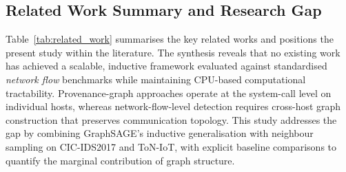 \documentclass[conference]{IEEEtran}
\begin{document}
\subsection{Related Work Summary and Research Gap}

Table~\ref{tab:related_work} summarises the key related works and positions the
present study within the literature. The synthesis reveals that no existing work
has achieved a scalable, inductive framework evaluated against standardised
\textit{network flow} benchmarks while maintaining CPU-based computational
tractability. Provenance-graph approaches \cite{xu2024,ren2023,han2020,king2003}
operate at the system-call level on individual hosts, whereas network-flow-level
detection requires cross-host graph construction that preserves communication
topology. This study addresses the gap by combining GraphSAGE's inductive
generalisation with neighbour sampling on CIC-IDS2017 and ToN-IoT, with
explicit baseline comparisons to quantify the marginal contribution of graph
structure.
\end{document}
